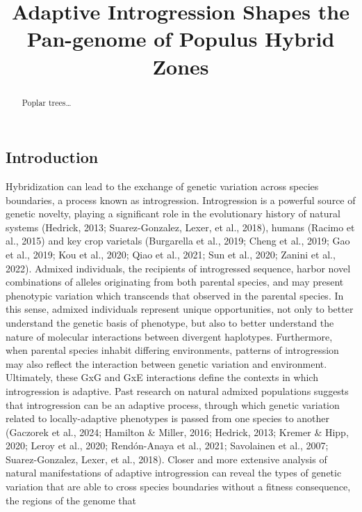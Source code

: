 \documentclass[
]{agujournal2019}
\begin{document}
\title{Adaptive Introgression Shapes the Pan-genome of Populus Hybrid
Zones}




\begin{abstract}
Poplar trees\ldots{}
\end{abstract}





\subsection{Introduction}\label{introduction}

Hybridization can lead to the exchange of genetic variation across
species boundaries, a process known as introgression. Introgression is a
powerful source of genetic novelty, playing a significant role in the
evolutionary history of natural systems (Hedrick, 2013; Suarez-Gonzalez,
Lexer, et al., 2018), humans (Racimo et al., 2015) and key crop
varietals (Burgarella et al., 2019; Cheng et al., 2019; Gao et al.,
2019; Kou et al., 2020; Qiao et al., 2021; Sun et al., 2020; Zanini et
al., 2022). Admixed individuals, the recipients of introgressed
sequence, harbor novel combinations of alleles originating from both
parental species, and may present phenotypic variation which transcends
that observed in the parental species. In this sense, admixed
individuals represent unique opportunities, not only to better
understand the genetic basis of phenotype, but also to better understand
the nature of molecular interactions between divergent haplotypes.
Furthermore, when parental species inhabit differing environments,
patterns of introgression may also reflect the interaction between
genetic variation and environment. Ultimately, these GxG and GxE
interactions define the contexts in which introgression is adaptive.
Past research on natural admixed populations suggests that introgression
can be an adaptive process, through which genetic variation related to
locally-adaptive phenotypes is passed from one species to another
(Gaczorek et al., 2024; Hamilton \& Miller, 2016; Hedrick, 2013; Kremer
\& Hipp, 2020; Leroy et al., 2020; Rendón-Anaya et al., 2021; Savolainen
et al., 2007; Suarez-Gonzalez, Lexer, et al., 2018). Closer and more
extensive analysis of natural manifestations of adaptive introgression
can reveal the types of genetic variation that are able to cross species
boundaries without a fitness consequence, the regions of the genome that
\end{document}
